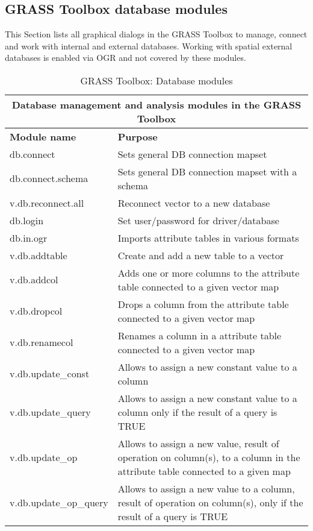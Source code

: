\subsection{GRASS Toolbox database modules}

This Section lists all graphical dialogs in the GRASS Toolbox to manage, 
connect and work with internal and external databases. Working with spatial 
external databases is enabled via OGR and not covered by these modules.

\begin{table}[ht]
\centering
\caption{GRASS Toolbox: Database modules}\medskip
 \begin{tabular}{|p{4cm}|p{12cm}|}
  \hline \multicolumn{2}{|c|}{\textbf{Database management and analysis modules in the GRASS
  Toolbox}} \\
  \hline \textbf{Module name} & \textbf{Purpose} \\
  \hline db.connect & Sets general DB connection mapset \\
  \hline db.connect.schema & Sets general DB connection mapset with a schema \\
  \hline v.db.reconnect.all & Reconnect vector to a new database \\
  \hline db.login & Set user/password for driver/database \\
  \hline db.in.ogr & Imports attribute tables in various formats \\
  \hline v.db.addtable & Create and add a new table to a vector \\
  \hline v.db.addcol & Adds one or more columns to the attribute table
  connected to a given vector map \\
  \hline v.db.dropcol & Drops a column from the attribute table connected to
  a given vector map\\
  \hline v.db.renamecol & Renames a column in a attribute table connected to
  a given vector map\\
  \hline v.db.update\_const & Allows to assign a new constant value to a
  column \\
  \hline v.db.update\_query & Allows to assign a new constant value to a
  column only if the result of a query is TRUE \\
  \hline v.db.update\_op & Allows to assign a new value, result of operation
  on column(s), to a column in the attribute table connected to a given map\\
  \hline v.db.update\_op\_query & Allows to assign a new value to a column,
  result of operation on column(s), only if the result of a query is TRUE \\

\end{tabular}
\end{table}
